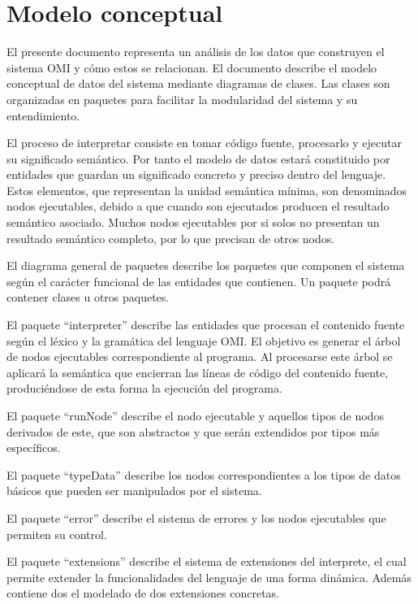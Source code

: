 \section{Modelo conceptual}
El presente documento representa un análisis de los datos que construyen
el sistema OMI y cómo estos se relacionan. El documento describe el 
modelo conceptual de datos del sistema mediante diagramas de clases. Las 
clases son organizadas en paquetes para facilitar la modularidad del sistema
y su entendimiento. 

El proceso de interpretar consiste en tomar código fuente, procesarlo y ejecutar 
su significado semántico. Por tanto el modelo de datos estará constituido por
entidades que guardan un significado concreto y preciso dentro del lenguaje.
Estos elementos, que representan la unidad semántica mínima, 
son denominados nodos ejecutables, debido a que cuando 
son ejecutados producen el resultado semántico asociado.  Muchos nodos ejecutables
por si solos no presentan un resultado semántico completo, por lo que precisan de otros
nodos. 

El diagrama general de paquetes describe los paquetes que componen el 
sistema según el carácter funcional de las entidades que contienen. Un 
paquete podrá contener clases u otros paquetes.

El paquete ``interpreter'' describe las entidades que procesan  
el contenido fuente según el léxico y la gramática del lenguaje OMI. 
El objetivo es generar el árbol de nodos ejecutables correspondiente al
programa. Al procesarse este árbol se aplicará la semántica que encierran 
las líneas de código del contenido fuente, produciéndose de esta forma la ejecución del programa.

El paquete ``runNode'' describe el nodo ejecutable y aquellos tipos de nodos derivados
de este, que son abstractos y que serán extendidos por tipos más específicos.

El paquete ``typeData'' describe los nodos correspondientes a los tipos de datos básicos 
que pueden ser manipulados por el sistema. 

El paquete ``error'' describe el sistema de errores y los nodos ejecutables que permiten
su control.

El paquete ``extensions'' describe el sistema de extensiones del interprete, el cual
permite extender la funcionalidades del lenguaje de una forma dinámica. Además contiene dos
el modelado de dos extensiones concretas.  

